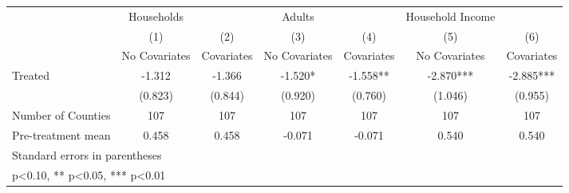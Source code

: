 {
\def\sym#1{\ifmmode^{#1}\else\(^{#1}\)\fi}
\begin{tabular}{l*{6}{c}}
\hline\hline
            &  Households   &               &      Adults   &               &Household Income   &               \\
            &\multicolumn{1}{c}{(1)}&\multicolumn{1}{c}{(2)}&\multicolumn{1}{c}{(3)}&\multicolumn{1}{c}{(4)}&\multicolumn{1}{c}{(5)}&\multicolumn{1}{c}{(6)}\\
            &\multicolumn{1}{c}{No Covariates}&\multicolumn{1}{c}{Covariates}&\multicolumn{1}{c}{No Covariates}&\multicolumn{1}{c}{Covariates}&\multicolumn{1}{c}{No Covariates}&\multicolumn{1}{c}{Covariates}\\
\hline
Treated     &      -1.312   &      -1.366   &      -1.520*  &      -1.558** &      -2.870***&      -2.885***\\
            &     (0.823)   &     (0.844)   &     (0.920)   &     (0.760)   &     (1.046)   &     (0.955)   \\
\hline
Number of Counties&         107   &         107   &         107   &         107   &         107   &         107   \\
Pre-treatment mean&       0.458   &       0.458   &      -0.071   &      -0.071   &       0.540   &       0.540   \\
\hline\hline
\multicolumn{7}{l}{\footnotesize Standard errors in parentheses}\\
\multicolumn{7}{l}{\footnotesize * p<0.10, ** p<0.05, *** p<0.01}\\
\end{tabular}
}
